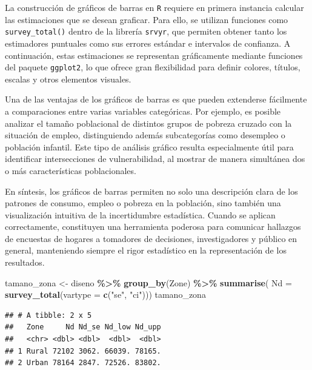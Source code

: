 \documentclass[
  12pt,
]{book}
\newenvironment{Shaded}{\begin{snugshade}}{\end{snugshade}}
\newcommand{\AttributeTok}[1]{\textcolor[rgb]{0.13,0.29,0.53}{#1}}
\newcommand{\FunctionTok}[1]{\textcolor[rgb]{0.13,0.29,0.53}{\textbf{#1}}}
\newcommand{\NormalTok}[1]{#1}
\newcommand{\OtherTok}[1]{\textcolor[rgb]{0.56,0.35,0.01}{#1}}
\newcommand{\SpecialCharTok}[1]{\textcolor[rgb]{0.81,0.36,0.00}{\textbf{#1}}}
\newcommand{\StringTok}[1]{\textcolor[rgb]{0.31,0.60,0.02}{#1}}
\begin{document}
La construcción de gráficos de barras en \texttt{R} requiere en primera instancia calcular las estimaciones que se desean graficar. Para ello, se utilizan funciones como \texttt{survey\_total()} dentro de la librería \texttt{srvyr}, que permiten obtener tanto los estimadores puntuales como sus errores estándar e intervalos de confianza. A continuación, estas estimaciones se representan gráficamente mediante funciones del paquete \texttt{ggplot2}, lo que ofrece gran flexibilidad para definir colores, títulos, escalas y otros elementos visuales.

Una de las ventajas de los gráficos de barras es que pueden extenderse fácilmente a comparaciones entre varias variables categóricas. Por ejemplo, es posible analizar el tamaño poblacional de distintos grupos de pobreza cruzado con la situación de empleo, distinguiendo además subcategorías como desempleo o población infantil. Este tipo de análisis gráfico resulta especialmente útil para identificar intersecciones de vulnerabilidad, al mostrar de manera simultánea dos o más características poblacionales.

En síntesis, los gráficos de barras permiten no solo una descripción clara de los patrones de consumo, empleo o pobreza en la población, sino también una visualización intuitiva de la incertidumbre estadística. Cuando se aplican correctamente, constituyen una herramienta poderosa para comunicar hallazgos de encuestas de hogares a tomadores de decisiones, investigadores y público en general, manteniendo siempre el rigor estadístico en la representación de los resultados.

\begin{Shaded}
\begin{Highlighting}[]
\NormalTok{tamano\_zona }\OtherTok{\textless{}{-}}\NormalTok{ diseno }\SpecialCharTok{\%\textgreater{}\%}
  \FunctionTok{group\_by}\NormalTok{(Zone) }\SpecialCharTok{\%\textgreater{}\%}
  \FunctionTok{summarise}\NormalTok{( }\AttributeTok{Nd =} \FunctionTok{survey\_total}\NormalTok{(}\AttributeTok{vartype =} \FunctionTok{c}\NormalTok{(}\StringTok{"se"}\NormalTok{, }\StringTok{"ci"}\NormalTok{)))}
\NormalTok{tamano\_zona }
\end{Highlighting}
\end{Shaded}

\begin{verbatim}
## # A tibble: 2 x 5
##   Zone     Nd Nd_se Nd_low Nd_upp
##   <chr> <dbl> <dbl>  <dbl>  <dbl>
## 1 Rural 72102 3062. 66039. 78165.
## 2 Urban 78164 2847. 72526. 83802.
\end{verbatim}
\end{document}
